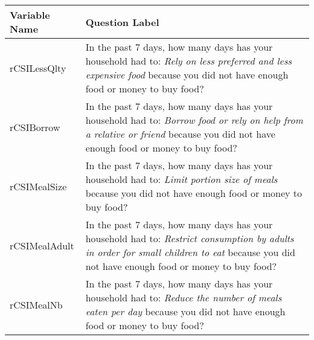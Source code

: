 \documentclass[
]{book}
\begin{document}
\begin{longtable}[]{@{}ll@{}}
\toprule
\begin{minipage}[b]{0.22\columnwidth}\raggedright
Variable Name\strut
\end{minipage} & \begin{minipage}[b]{0.72\columnwidth}\raggedright
Question Label\strut
\end{minipage}\tabularnewline
\midrule
\endhead
\begin{minipage}[t]{0.22\columnwidth}\raggedright
rCSILessQlty\strut
\end{minipage} & \begin{minipage}[t]{0.72\columnwidth}\raggedright
In the past 7 days, how many days has your household had to: \emph{Rely on less preferred and less expensive food} because you did not have enough food or money to buy food?\strut
\end{minipage}\tabularnewline
\begin{minipage}[t]{0.22\columnwidth}\raggedright
rCSIBorrow\strut
\end{minipage} & \begin{minipage}[t]{0.72\columnwidth}\raggedright
In the past 7 days, how many days has your household had to: \emph{Borrow food or rely on help from a relative or friend} because you did not have enough food or money to buy food?\strut
\end{minipage}\tabularnewline
\begin{minipage}[t]{0.22\columnwidth}\raggedright
rCSIMealSize\strut
\end{minipage} & \begin{minipage}[t]{0.72\columnwidth}\raggedright
In the past 7 days, how many days has your household had to: \emph{Limit portion size of meals} because you did not have enough food or money to buy food?\strut
\end{minipage}\tabularnewline
\begin{minipage}[t]{0.22\columnwidth}\raggedright
rCSIMealAdult\strut
\end{minipage} & \begin{minipage}[t]{0.72\columnwidth}\raggedright
In the past 7 days, how many days has your household had to: \emph{Restrict consumption by adults in order for small children to eat} because you did not have enough food or money to buy food?\strut
\end{minipage}\tabularnewline
\begin{minipage}[t]{0.22\columnwidth}\raggedright
rCSIMealNb\strut
\end{minipage} & \begin{minipage}[t]{0.72\columnwidth}\raggedright
In the past 7 days, how many days has your household had to: \emph{Reduce the number of meals eaten per day} because you did not have enough food or money to buy food?\strut
\end{minipage}\tabularnewline
\bottomrule
\end{longtable}
\end{document}
